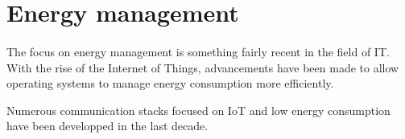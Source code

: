\section{Energy management}









\paragraph{}
The focus on energy management is something fairly recent in the field of IT.
With the rise of the Internet of Things, advancements have been made to allow operating systems to manage energy consumption more efficiently.

Numerous communication stacks focused on IoT and low energy consumption have been developped in the last decade.

